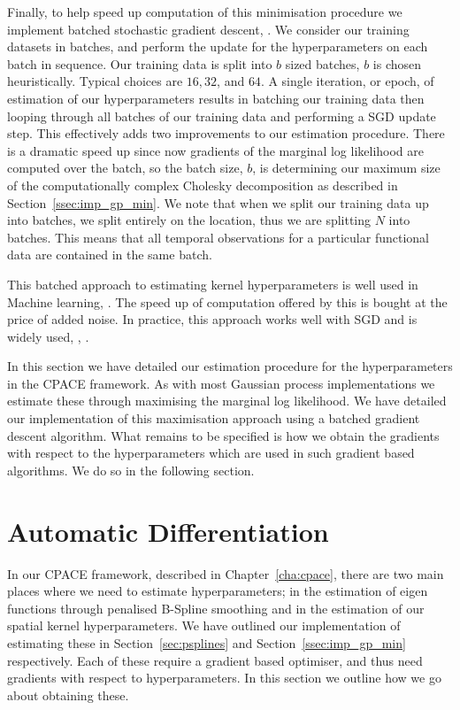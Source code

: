 Finally, to help speed up computation of this minimisation procedure we implement batched stochastic gradient descent, \citep{li_efficient_2014}.
We consider our training datasets in batches, and perform the update for the hyperparameters on each batch in sequence.
Our training data is split into $b$ sized batches, $b$ is chosen heuristically.
Typical choices are $16, 32$, and $64$.
A single iteration, or epoch, of estimation of our hyperparameters results in batching our training data then looping through all batches of our training data and performing a SGD update step.
This effectively adds two improvements to our estimation procedure.
There is a dramatic speed up since now gradients of the marginal log likelihood are computed over the batch, so the batch size, $b$, is determining our maximum size of the computationally complex Cholesky decomposition as described in Section~\ref{ssec:imp_gp_min}.
We note that when we split our training data up into batches, we split entirely on the location, thus we are splitting $N$ into batches.
This means that all temporal observations for a particular functional data are contained in the same batch.

This batched approach to estimating kernel hyperparameters is well used in Machine learning, \citep{li_efficient_2014}. 
The speed up of computation offered by this is bought at the price of added noise.
In practice, this approach works well with SGD and is widely used, \citep{li_efficient_2014}, \citep{sra_optimization_2012}.

In this section we have detailed our estimation procedure for the hyperparameters in the CPACE framework.
As with most Gaussian process implementations we estimate these through maximising the marginal log likelihood.
We have detailed our implementation of this maximisation approach using a batched gradient descent algorithm. 
What remains to be specified is how we obtain the gradients with respect to the hyperparameters which are used in such gradient based algorithms.
We do so in the following section.

\section{Automatic Differentiation \label{sec:auto_diff}}
In our CPACE framework, described in Chapter~\ref{cha:cpace}, there are two main places where we need to estimate hyperparameters;
in the estimation of eigen functions through penalised B-Spline smoothing and in the estimation of our spatial kernel hyperparameters.
We have outlined our implementation of estimating these in Section~\ref{sec:psplines} and Section~\ref{ssec:imp_gp_min} respectively.
Each of these require a gradient based optimiser, and thus need gradients with respect to hyperparameters.
In this section we outline how we go about obtaining these.

